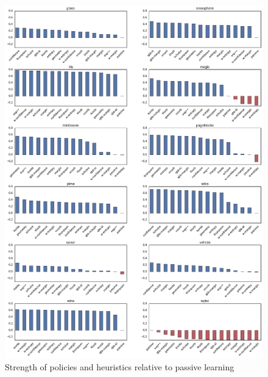 \documentclass[fleqn,10pt,lineno]{wlpeerj} %
\begin{document}
\begin{figure}[tbp]
	\centering
	\includegraphics[width=\textwidth]{figures/strengths}
	\caption[Policy strength]{Strength of policies and heuristics relative to passive learning}
	\label{fig:strengths}
\end{figure}
\end{document}
